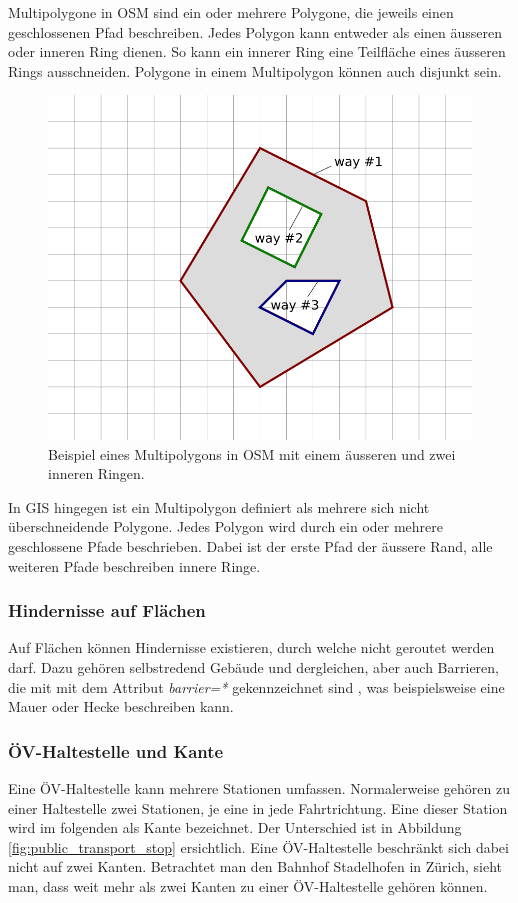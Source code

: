 Multipolygone in \ac{OSM} sind ein oder mehrere Polygone, die jeweils einen geschlossenen Pfad beschreiben. Jedes Polygon kann entweder als einen äusseren oder inneren Ring dienen. So kann ein innerer Ring eine Teilfläche eines äusseren Rings ausschneiden. Polygone in einem Multipolygon können auch disjunkt sein. \cite{osm_wiki_multipolygon}

\begin{figure}[th]
\centering
\includegraphics[width=0.5\linewidth]{technicalreport/img/multipolygon_osm_example.png}
\caption[Multipolygon OSM Example]{Beispiel eines Multipolygons in \ac{OSM} mit einem äusseren und zwei inneren Ringen. \cite{osm_wiki_multipolygon}}
\label{fig:multipolygon_osm_example}
\end{figure}

In \ac{GIS} hingegen ist ein Multipolygon definiert als mehrere sich nicht überschneidende Polygone. Jedes Polygon wird durch ein oder mehrere geschlossene Pfade beschrieben. Dabei ist der erste Pfad der äussere Rand, alle weiteren Pfade beschreiben innere Ringe. \cite{opengis_simple_features}

\subsubsection{Hindernisse auf Flächen}
\label{Hindernisse in Flächen}

Auf Flächen können Hindernisse existieren, durch welche nicht geroutet werden darf. Dazu gehören selbstredend Gebäude und dergleichen, aber auch Barrieren, die mit  mit dem Attribut \textit{barrier=*} gekennzeichnet sind \cite{osm_wiki_barrier}, was beispielsweise eine Mauer oder Hecke beschreiben kann.

\subsubsection{ÖV-Haltestelle und Kante}
\label{ÖV-Haltestelle und Kante}
Eine ÖV-Haltestelle kann mehrere Stationen umfassen. Normalerweise gehören zu einer Haltestelle zwei Stationen, je eine in jede Fahrtrichtung. Eine dieser Station wird im folgenden als Kante bezeichnet. Der Unterschied ist in Abbildung \ref{fig:public_transport_stop} ersichtlich. Eine ÖV-Haltestelle beschränkt sich dabei nicht auf zwei Kanten. Betrachtet man den Bahnhof Stadelhofen in Zürich, sieht man, dass weit mehr als zwei Kanten zu einer ÖV-Haltestelle gehören können.

